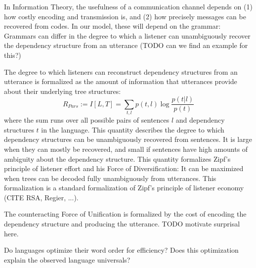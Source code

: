 \documentclass[9pt,twocolumn,twoside,lineno]{pnas-new}
\begin{document}
In Information Theory, the usefulness of a communication channel depends on (1) how costly encoding and transmission is, and (2) how precisely messages can be recovered from codes.
In our model, these will depend on the grammar:
Grammars can differ in the degree to which a listener can unambiguously recover the dependency structure from an utterance (TODO can we find an example for this?)


The degree to which listeners can reconstruct dependency structures from an utterance is formalized as the amount of information that utterances provide about their underlying tree structures:
\begin{equation}
	R_{Pars} := I[L,T] = \sum_{t,l} p(t,l) \log \frac{p(t|l)}{p(t)}
\end{equation}
where the sum runs over all possible pairs of sentences $l$ and dependency structures $t$ in the language.
This quantity describes the degree to which dependency structures can be unambiguously recovered from sentences.
It is large when they can mostly be recovered, and small if sentences have high amounts of ambiguity about the dependency structure.
This quantity formalizes Zipf's principle of listener effort and his Force of Diversification:
It can be maximized when trees can be decoded fully unambiguously from utterances.
This formalization is a standard formalization of Zipf's principle of listener economy (CITE RSA, Regier, ...).


The counteracting Force of Unification is formalized by the cost of encoding the dependency structure and producing the utterance.
TODO motivate surprisal here.





Do languages optimize their word order for efficiency?
Does this optimization explain the observed language universals?

\end{document}
